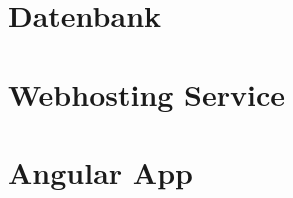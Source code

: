 \section{Datenbank}
    \lipsum[5-12]
\section{Webhosting Service}
    \lipsum[5-12]
\section{Angular App}
    \lipsum[5-12]
